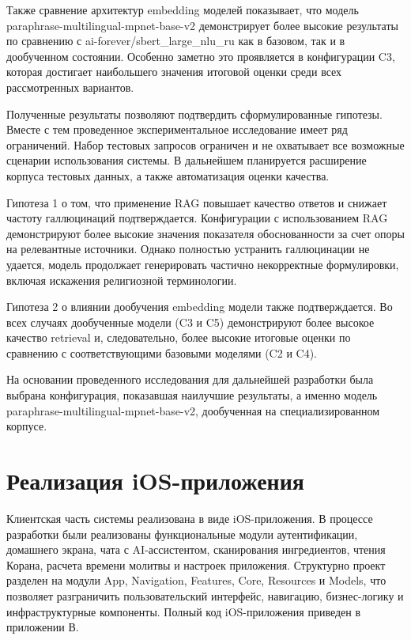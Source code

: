 Также сравнение архитектур embedding моделей показывает, что модель paraphrase-multilingual-mpnet-base-v2 демонстрирует более высокие результаты по сравнению с ai-forever/sbert\_large\_nlu\_ru как в базовом, так и в дообученном состоянии. Особенно заметно это проявляется в конфигурации C3, которая достигает наибольшего значения итоговой оценки среди всех рассмотренных вариантов.


Полученные результаты позволяют подтвердить сформулированные гипотезы. Вместе с тем проведенное экспериментальное исследование имеет ряд ограничений. Набор тестовых запросов ограничен и не охватывает все возможные сценарии использования системы. В дальнейшем планируется расширение корпуса тестовых данных, а также автоматизация оценки качества.


Гипотеза 1 о том, что применение RAG повышает качество ответов и снижает частоту галлюцинаций подтверждается. Конфигурации с использованием RAG демонстрируют более высокие значения показателя обоснованности за счет опоры на релевантные источники. Однако полностью устранить галлюцинации не удается, модель продолжает генерировать частично некорректные формулировки, включая искажения религиозной терминологии.


Гипотеза 2 о влиянии дообучения embedding модели также подтверждается. Во всех случаях дообученные модели (C3 и C5) демонстрируют более высокое качество retrieval и, следовательно, более высокие итоговые оценки по сравнению с соответствующими базовыми моделями (C2 и C4).


На основании проведенного исследования для дальнейшей разработки была выбрана конфигурация, показавшая наилучшие результаты, а именно модель paraphrase-multilingual-mpnet-base-v2, дообученная на специализированном корпусе.


\section{Реализация iOS-приложения}


Клиентская часть системы реализована в виде iOS-приложения. В процессе разработки были реализованы функциональные модули аутентификации, домашнего экрана, чата с AI-ассистентом, сканирования ингредиентов, чтения Корана, расчета времени молитвы и настроек приложения. Структурно проект разделен на модули App, Navigation, Features, Core, Resources и Models, что позволяет разграничить пользовательский интерфейс, навигацию, бизнес-логику и инфраструктурные компоненты. Полный код iOS-приложения приведен в приложении В.



